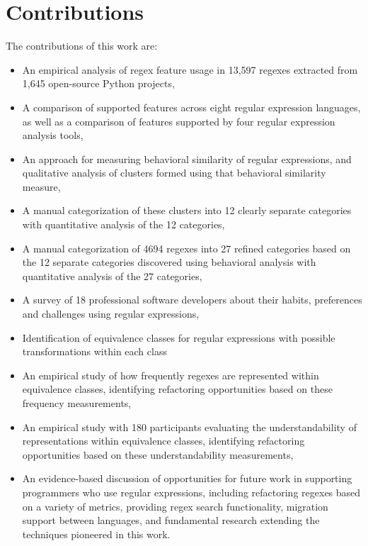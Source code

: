 \section{Contributions}

The contributions of this work are:
\begin{itemize} \setlength \itemsep{.1pt}
    \item An empirical analysis of regex feature usage in 13,597 regexes extracted from 1,645 open-source Python projects,
    \item A comparison of supported features across eight regular expression languages, as well as a comparison of features supported by four regular expression analysis tools,
    \item An approach for measuring behavioral similarity of regular expressions, and qualitative analysis of clusters formed using that behavioral similarity measure,
    \item A manual categorization of these clusters into 12 clearly separate categories with quantitative analysis of the 12 categories,
    \item A manual categorization of 4694 regexes into 27 refined categories based on the 12 separate categories discovered using behavioral analysis with quantitative analysis of the 27 categories,
    \item A survey of 18 professional software developers about their habits, preferences and challenges using regular expressions,
    \item Identification of equivalence classes for regular expressions with possible transformations within each class
    \item An empirical study of how frequently regexes are represented within equivalence classes, identifying refactoring opportunities based on these frequency measurements,
    \item An empirical study with 180 participants evaluating the understandability of representations within equivalence classes, identifying refactoring opportunities based on these understandability measurements,
    \item An evidence-based discussion of opportunities for future work in supporting programmers who use regular expressions, including refactoring regexes based on a variety of metrics, providing regex search functionality, migration support between languages, and fundamental research extending the techniques pioneered in this work.
\end{itemize}
